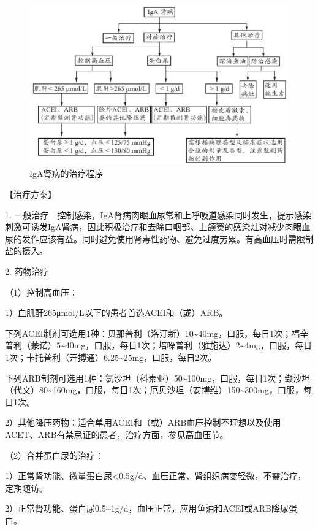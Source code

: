 \begin{figure}[!htbp]
 \centering
 \includegraphics{./images/Image00124.jpg}
 \captionsetup{justification=centering}
 \caption{IgA肾病的治疗程序}
 \label{fig4-1-5}
  \end{figure} 

【治疗方案】

1.
一般治疗　控制感染，IgA肾病肉眼血尿常和上呼吸道感染同时发生，提示感染刺激可诱发IgA肾病，因此积极治疗和去除口咽部、上颌窦的感染灶对减少肉眼血尿的发作应该有益。同时避免使用肾毒性药物、避免过度劳累。有高血压时需限制盐的摄入。

2. 药物治疗

（1）控制高血压：

1）血肌酐265μmol/L以下的患者首选ACEI和（或）ARB。

下列ACEI制剂可选用1种：贝那普利（洛汀新）10\textasciitilde{}40mg，口服，每日1次；福辛普利（蒙诺）5\textasciitilde{}40mg，口服，每日1次；培哚普利（雅施达）2\textasciitilde{}4mg，口服，每日1次；卡托普利（开搏通）6.25\textasciitilde{}25mg，口服，每日2次。

下列ARB制剂可选用1种：氯沙坦（科素亚）50\textasciitilde{}100mg，口服，每日1次；缬沙坦（代文）80\textasciitilde{}160mg，口服，每日1次；厄贝沙坦（安博维）150\textasciitilde{}300mg，口服，每日1次。

2）其他降压药物：适合单用ACEI和（或）ARB血压控制不理想以及使用ACET、ARB有禁忌证的患者，治疗方面，参见高血压节。

（2）合并蛋白尿的治疗：

1）正常肾功能、微量蛋白尿\textless{}0.5g/d、血压正常、肾组织病变轻微，不需治疗，定期随访。

2）正常肾功能、蛋白尿0.5\textasciitilde{}1g/d，血压正常，应用鱼油和ACEI或ARB降尿蛋白。

